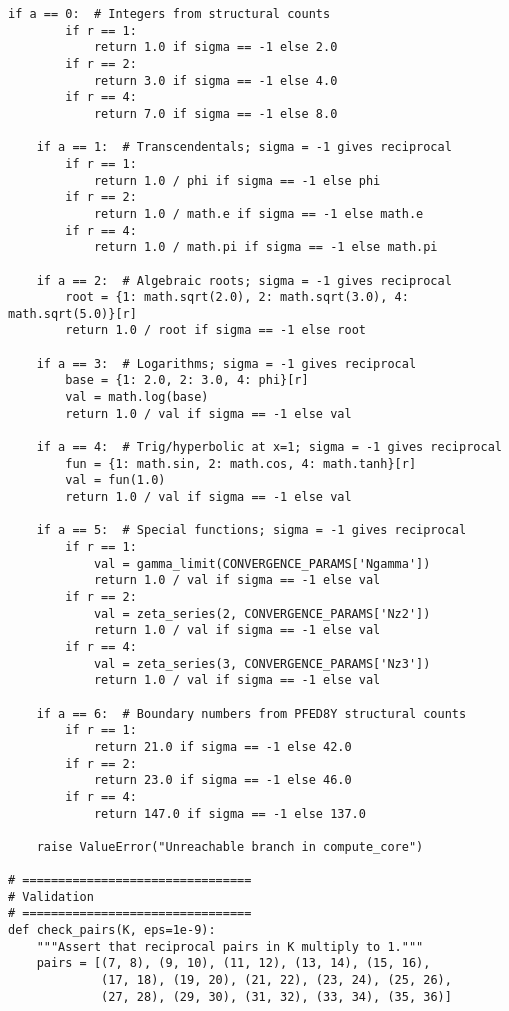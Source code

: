 \documentclass[pdflatex,sn-mathphys-num]{sn-jnl}
\theoremstyle{thmstyleone}
\theoremstyle{thmstyletwo}
\theoremstyle{thmstylethree}
\begin{document}
\begin{appendices}
\begin{lstlisting}[style=pythonstyle, caption={Kosmoplex Set Generator Implementation}, label={lst:kosmoplex}]
    if a == 0:  # Integers from structural counts
        if r == 1:
            return 1.0 if sigma == -1 else 2.0
        if r == 2:
            return 3.0 if sigma == -1 else 4.0
        if r == 4:
            return 7.0 if sigma == -1 else 8.0
    
    if a == 1:  # Transcendentals; sigma = -1 gives reciprocal
        if r == 1:
            return 1.0 / phi if sigma == -1 else phi
        if r == 2:
            return 1.0 / math.e if sigma == -1 else math.e
        if r == 4:
            return 1.0 / math.pi if sigma == -1 else math.pi
    
    if a == 2:  # Algebraic roots; sigma = -1 gives reciprocal
        root = {1: math.sqrt(2.0), 2: math.sqrt(3.0), 4: math.sqrt(5.0)}[r]
        return 1.0 / root if sigma == -1 else root
    
    if a == 3:  # Logarithms; sigma = -1 gives reciprocal
        base = {1: 2.0, 2: 3.0, 4: phi}[r]
        val = math.log(base)
        return 1.0 / val if sigma == -1 else val
    
    if a == 4:  # Trig/hyperbolic at x=1; sigma = -1 gives reciprocal
        fun = {1: math.sin, 2: math.cos, 4: math.tanh}[r]
        val = fun(1.0)
        return 1.0 / val if sigma == -1 else val
    
    if a == 5:  # Special functions; sigma = -1 gives reciprocal
        if r == 1:
            val = gamma_limit(CONVERGENCE_PARAMS['Ngamma'])
            return 1.0 / val if sigma == -1 else val
        if r == 2:
            val = zeta_series(2, CONVERGENCE_PARAMS['Nz2'])
            return 1.0 / val if sigma == -1 else val
        if r == 4:
            val = zeta_series(3, CONVERGENCE_PARAMS['Nz3'])
            return 1.0 / val if sigma == -1 else val
    
    if a == 6:  # Boundary numbers from PFED8Y structural counts
        if r == 1:
            return 21.0 if sigma == -1 else 42.0
        if r == 2:
            return 23.0 if sigma == -1 else 46.0
        if r == 4:
            return 147.0 if sigma == -1 else 137.0
    
    raise ValueError("Unreachable branch in compute_core")

# ================================
# Validation
# ================================
def check_pairs(K, eps=1e-9):
    """Assert that reciprocal pairs in K multiply to 1."""
    pairs = [(7, 8), (9, 10), (11, 12), (13, 14), (15, 16), 
             (17, 18), (19, 20), (21, 22), (23, 24), (25, 26), 
             (27, 28), (29, 30), (31, 32), (33, 34), (35, 36)]
    

\end{lstlisting}
\end{appendices}
\end{document}
